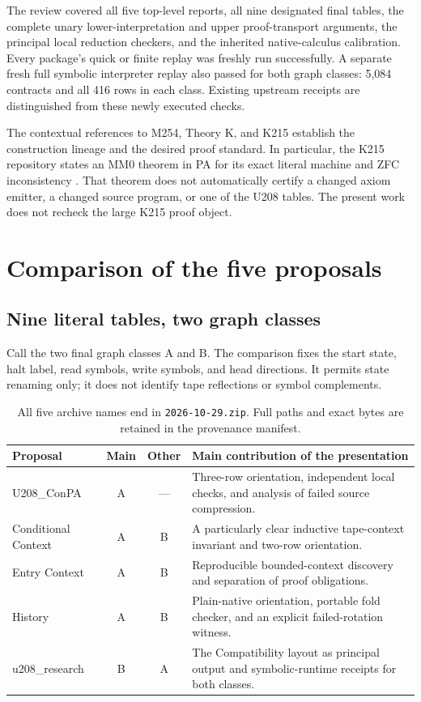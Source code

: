 \documentclass[11pt,a4paper]{article}
\theoremstyle{definition}
\begin{document}
The review covered all five top-level reports, all nine designated final tables, the complete unary lower-interpretation and upper proof-transport arguments, the principal local reduction checkers, and the inherited native-calculus calibration. Every package's quick or finite replay was freshly run successfully. A separate fresh full symbolic interpreter replay also passed for both graph classes: 5,084 contracts and all 416 rows in each class. Existing upstream receipts are distinguished from these newly executed checks.

The contextual references to M254, Theory K, and K215 establish the construction lineage and the desired proof standard. In particular, the K215 repository states an MM0 theorem in PA for its exact literal machine and ZFC inconsistency \cite{k215pa}. That theorem does not automatically certify a changed axiom emitter, a changed source program, or one of the U208 tables. The present work does not recheck the large K215 proof object.

\section{Comparison of the five proposals}
\label{sec:comparison}

\subsection{Nine literal tables, two graph classes}

Call the two final graph classes A and B. The comparison fixes the start state, halt label, read symbols, write symbols, and head directions. It permits state renaming only; it does not identify tape reflections or symbol complements.

\begin{table}[htbp]
\centering\small
\begin{tabularx}{\textwidth}{@{}P{0.25\textwidth}ccY@{}}
\toprule
Proposal & Main & Other & Main contribution of the presentation\\
\midrule
U208\_ConPA & A & --- & Three-row orientation, independent local checks, and analysis of failed source compression.\\
Conditional Context & A & B & A particularly clear inductive tape-context invariant and two-row orientation.\\
Entry Context & A & B & Reproducible bounded-context discovery and separation of proof obligations.\\
History & A & B & Plain-native orientation, portable fold checker, and an explicit failed-rotation witness.\\
u208\_research & B & A & The Compatibility layout as principal output and symbolic-runtime receipts for both classes.\\
\bottomrule
\end{tabularx}
\caption{All five archive names end in \texttt{2026-10-29.zip}. Full paths and exact bytes are retained in the provenance manifest.}
\end{table}
\end{document}
